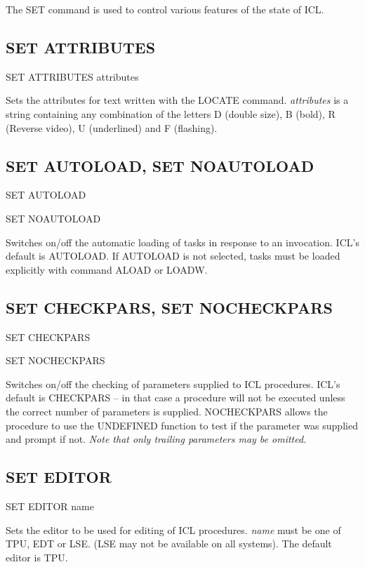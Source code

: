 The SET command is used to control various features of the state of ICL.

\subsection{SET ATTRIBUTES}

   SET ATTRIBUTES \hspace{.5cm} attributes

Sets the attributes for text written with the LOCATE command. {\it attributes}
is a string containing any combination of the letters D (double size),
B (bold), R (Reverse video), U (underlined) and F (flashing).

\subsection{SET AUTOLOAD, SET NOAUTOLOAD}

   SET AUTOLOAD

   SET NOAUTOLOAD

Switches on/off the automatic loading of tasks in response to an invocation.
ICL's default is AUTOLOAD.
If AUTOLOAD is not selected, tasks must be loaded explicitly with command
ALOAD or LOADW.

\subsection{SET CHECKPARS, SET NOCHECKPARS}

   SET CHECKPARS

   SET NOCHECKPARS

Switches on/off the checking of parameters supplied to ICL procedures.
ICL's default is CHECKPARS -- in that case a procedure will not be executed
unless the correct number of parameters is supplied. NOCHECKPARS allows
the procedure to use the UNDEFINED function to test if the parameter was
supplied and prompt if not. 
{\em Note that only trailing parameters may be omitted.}

\subsection{SET EDITOR}

   SET EDITOR \hspace{.5cm} name

Sets the editor to be used for editing of ICL procedures. {\em name}
must be one of TPU, EDT or LSE. (LSE may not be available on all systems).
The default editor is TPU.

